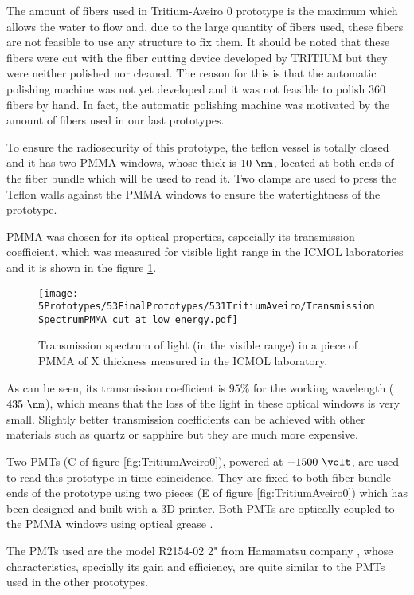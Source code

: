 The amount of fibers used in Tritium-Aveiro 0 prototype is the maximum which allows the water to flow and, due to the large quantity of fibers used, these fibers are not feasible to use any structure to fix them. It should be noted that these fibers were cut with the fiber cutting device developed by TRITIUM but they were neither polished nor cleaned. The reason for this is that the automatic polishing machine was not yet developed and it was not feasible to polish 360 fibers by hand. In fact, the automatic polishing machine was motivated by the amount of fibers used in our last prototypes.

To ensure the radiosecurity of this prototype, the teflon vessel is totally closed and it has two PMMA windows, whose thick is $10~\mm$, located at both ends of the fiber bundle which will be used to read it. Two clamps are used to press the Teflon walls against the PMMA windows to ensure the watertightness of the prototype.

PMMA was chosen for its optical properties, especially its transmission coefficient, which was measured for visible light range in the ICMOL laboratories and it is shown in the figure \ref{fig:PMMATransmissionSpectrum}.

\begin{figure}[h]
\centering
\texttt{[image: 5Prototypes/53FinalPrototypes/531TritiumAveiro/TransmissionSpectrumPMMA\_cut\_at\_low\_energy.pdf]}
\caption{Transmission spectrum of light (in the visible range) in a piece of PMMA of X thickness measured in the ICMOL laboratory. \label{fig:PMMATransmissionSpectrum}}
\end{figure}	

As can be seen, its transmission coefficient is $95\%$ for the working wavelength ($435~\nm$), which means that the loss of the light in these optical windows is very small. Slightly better transmission coefficients can be achieved with other materials such as quartz or sapphire but they are much more expensive.

Two PMTs (C of figure \ref{fig:TritiumAveiro0}), powered at $-1500~\volt$, are used to read this prototype in time coincidence. They are fixed to both fiber bundle ends of the prototype using two pieces (E of figure \ref{fig:TritiumAveiro0}) which has been designed and built with a 3D printer. Both PMTs are optically coupled to the PMMA windows using optical grease \cite{OpticalGrease}.

The PMTs used are the model R2154-02 2" from Hamamatsu company \cite{DataSheetPMTsAveiro}, whose characteristics, specially its gain and efficiency, are quite similar to the PMTs used in the other prototypes.

